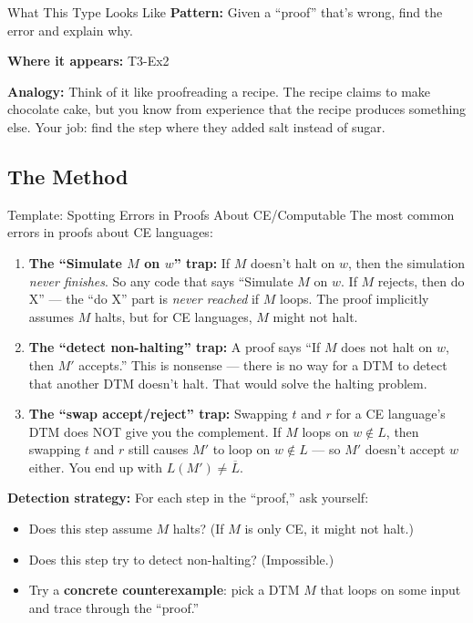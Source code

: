 \documentclass[11pt,a4paper]{article}
\begin{document}
\begin{notebox}{What This Type Looks Like}
\textbf{Pattern:} Given a ``proof'' that's wrong, find the error and explain why.

\textbf{Where it appears:} T3-Ex2

\textbf{Analogy:} Think of it like proofreading a recipe. The recipe claims to make chocolate cake, but you know from experience that the recipe produces something else. Your job: find the step where they added salt instead of sugar.
\end{notebox}

\subsection{The Method}

\begin{templatebox}{Template: Spotting Errors in Proofs About CE/Computable}
The most common errors in proofs about CE languages:

\begin{enumerate}
    \item \textbf{The ``Simulate $M$ on $w$'' trap:} If $M$ doesn't halt on $w$, then the simulation \emph{never finishes}. So any code that says ``Simulate $M$ on $w$. If $M$ rejects, then do X'' --- the ``do X'' part is \emph{never reached} if $M$ loops. The proof implicitly assumes $M$ halts, but for CE languages, $M$ might not halt.

    \item \textbf{The ``detect non-halting'' trap:} A proof says ``If $M$ does not halt on $w$, then $M'$ accepts.'' This is nonsense --- there is no way for a DTM to detect that another DTM doesn't halt. That would solve the halting problem.

    \item \textbf{The ``swap accept/reject'' trap:} Swapping $t$ and $r$ for a CE language's DTM does NOT give you the complement. If $M$ loops on $w \notin L$, then swapping $t$ and $r$ still causes $M'$ to loop on $w \notin L$ --- so $M'$ doesn't accept $w$ either. You end up with $L(M') \neq \overline{L}$.
\end{enumerate}

\textbf{Detection strategy:} For each step in the ``proof,'' ask yourself:
\begin{itemize}
    \item Does this step assume $M$ halts? (If $M$ is only CE, it might not halt.)
    \item Does this step try to detect non-halting? (Impossible.)
    \item Try a \textbf{concrete counterexample}: pick a DTM $M$ that loops on some input and trace through the ``proof.''
\end{itemize}
\end{templatebox}
\end{document}
